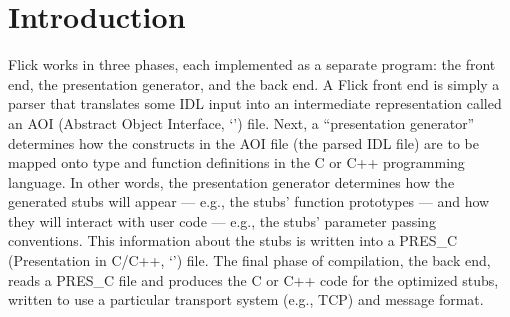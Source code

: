 

\section{Introduction}
\label{sec:Introduction}

Flick works in three phases, each implemented as a separate program: the front
end, the presentation generator, and the back end.  A Flick front end is simply
a parser that translates some IDL input into an intermediate representation
called an AOI (Abstract Object Interface, `') file.  Next, a
``presentation generator'' determines how the constructs in the AOI file (the
parsed IDL file) are to be mapped onto type and function definitions in the C
or C++ programming language.  In other words, the presentation generator
determines how the generated stubs will appear --- e.g., the stubs' function
prototypes --- and how they will interact with user code --- e.g., the stubs'
parameter passing conventions.  This information about the stubs is written
into a PRES\_C (Presentation in C/C++, `') file.  The final
phase of compilation, the back end, reads a PRES\_C file and produces the C or
C++ code for the optimized stubs, written to use a particular transport system
(e.g., TCP) and message format.

